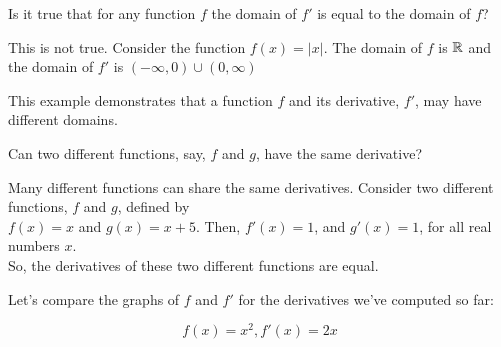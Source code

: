 \documentclass{ximera}
\begin{document}
\begin{question}
  Is it true that for any function $f$ the domain of $f'$ is equal to the domain of $f$?
  \begin{prompt}
  \begin{multipleChoice}
  \end{multipleChoice}
  \begin{feedback}
  This is not true. 
  Consider the function $f(x)=|x|$. 
The domain of $f$ is $\mathbb R$ and the domain of $f'$ is $(-\infty,0)\cup(0,\infty)$


This example demonstrates that a function $f$ and its derivative, $f'$, may have different domains.
  \end{feedback}
  \end{prompt}
\end{question}

\begin{question}
  Can two different functions, say, $f$ and $g$, have the same derivative?
  \begin{prompt}
  \begin{multipleChoice}
  \end{multipleChoice}
  \begin{feedback}
    Many different functions can share the same derivatives.
    Consider two different functions, $f$ and $g$, defined by\\
    $f(x)=x$ and $g(x)=x+5$.
    Then, $f'(x)=1$, and $g'(x)=1$, for all real numbers $x$.\\
    So,  the derivatives of these two different functions are equal.

  \end{feedback}
  \end{prompt}
\end{question}

Let's compare the graphs of $f$ and $f'$ for the derivatives we've computed so far:

\[f(x)=x^2, f'(x)=2x\]
\begin{image}
  \end{image}
\end{document}
